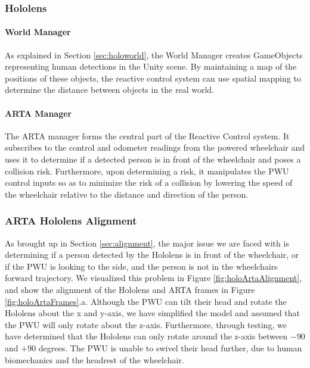 \subsubsection{Hololens}
\paragraph{World Manager} As explained in Section \ref{sec:holoworld}, the World Manager creates GameObjects representing human detections in the Unity scene. By maintaining a map of the positions of these objects, the reactive control system can use spatial mapping to determine the distance between objects in the real world.

\paragraph{ARTA Manager} The ARTA manager forms the central part of the Reactive Control system. It subscribes to the control and odometer readings from the powered wheelchair and uses it to determine if a detected person is in front of the wheelchair and poses a collision risk. Furthermore, upon determining a risk, it manipulates the PWU control inputs so as to minimize the risk of a collision by lowering the speed of the wheelchair relative to the distance and direction of the person.

\subsubsection{ARTA Hololens Alignment}
As brought up in Section \ref{sec:alignment}, the major issue we are faced with is determining if a person detected by the Hololens is in front of the wheelchair, or if the PWU is looking to the side, and the person is not in the wheelchairs forward trajectory. We visualized this problem in Figure \ref{fig:holoArtaAlignment}, and show the alignment of the Hololens and ARTA frames in Figure \ref{fig:holoArtaFrames}.a. Although the PWU can tilt their head and rotate the Hololens about the x and y-axis, we have simplified the model and assumed that the PWU will only rotate about the z-axis. Furthermore, through testing, we have determined that the Hololens can only rotate around the z-axis between $-90$ and $+90$ degrees. The PWU is unable to swivel their head further, due to human biomechanics and the headrest of the wheelchair.

